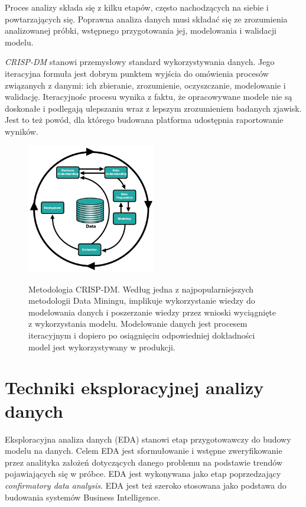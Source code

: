\documentclass[12pt,a4paper,oneside]{report} %
\begin{document}
Proces analizy składa się z kilku etapów, często nachodzących na siebie i powtarzających się. Poprawna analiza danych musi składać się ze zrozumienia analizowanej próbki, wstępnego przygotowania jej, modelowania i walidacji modelu. \par

\emph{CRISP-DM} stanowi przemysłowy standard wykorzystywania danych. Jego iteracyjna formuła jest dobrym punktem wyjścia do omówienia procesów związanych z danymi: ich zbieranie, zrozumienie, oczyszczanie, modelowanie i walidację. Iteracyjnośc procesu wynika z faktu, że opracowywane modele nie są doskonałe i podlegają ulepszaniu wraz z lepszym zrozumieniem badanych zjawisk. Jest to też powód, dla którego budowana platforma udostępnia raportowanie wyników. \cite{crispdm} \par

\begin{figure}
\centering
\includegraphics[width=0.5\textwidth]{crisp-dm.png}
\label{crisp-dm}
\caption{Metodologia CRISP-DM. Według \cite{crispdm} jedna z najpopularniejszych metodologii Data Miningu, implikuje wykorzystanie wiedzy do modelowania danych i poszerzanie wiedzy przez wnioski wyciągnięte z wykorzystania modelu. Modelowanie danych jest procesem iteracyjnym i dopiero po osiągnięciu odpowiedniej dokładności model jest wykorzystywany w produkcji.}
\end{figure}





\section{Techniki eksploracyjnej analizy danych}

Eksploracyjna analiza danych (EDA) stanowi etap przygotowawczy do budowy modelu na danych. Celem EDA jest sformułowanie i wstępne zweryfikowanie przez analityka założeń dotyczących danego problemu na podstawie trendów pojawiających się w próbce. EDA jest wykonywana jako etap poprzedzający \emph{confirmatory data analysis}. EDA jest też szeroko stosowana jako podstawa do budowania systemów Business Intelligence.\cite{hseltman} \par 
\end{document}
